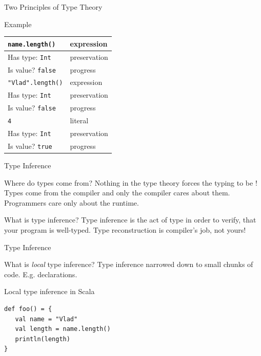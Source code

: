 \begin{frame}[fragile]{Two Principles of Type Theory}
\begin{exampleblock}{Example}
\begin{center}
\begin{tabular}{l|l}
\hline
\lstinline!name.length()! & expression\\
\hline
Has type: \lstinline!Int! & preservation\\
Is value? \lstinline!false! & progress\\
\hline
\hline
\pause
\lstinline!"Vlad".length()! & expression\\
\hline
Has type: \lstinline!Int! & preservation\\
Is value? \lstinline!false! & progress\\
\hline
\hline
\pause
\lstinline!4! & literal\\
\hline
Has type: \lstinline!Int! & preservation\\
Is value? \lstinline!true! &  progress\\
\hline
\end{tabular}
\end{center}
\end{exampleblock}
\end{frame}

\begin{frame}{Type Inference}
\begin{block}{Where do types come from?}
\alert{Nothing} in the type theory forces the typing to be
! Types come from the compiler and only the compiler cares
about them. Programmers care only about the runtime.
\end{block}
\pause
\begin{block}{What is type inference?}
Type inference is the act of type  in order to
verify, that your program is well-typed. Type reconstruction is compiler's job,
\alert{not} yours!
\end{block}
\end{frame}

\begin{frame}[fragile]{Type Inference}
\begin{block}{What is \emph{local} type inference?}
Type inference narrowed down to small chunks of code. E.g. declarations.
\end{block}
\pause
\begin{exampleblock}{Local type inference in Scala}
\begin{lstlisting}
def foo() = {
   val name = "Vlad"
   val length = name.length()
   println(length)
}
\end{lstlisting}
\end{exampleblock}
\end{frame}

